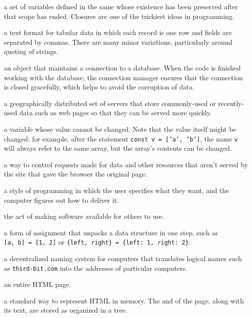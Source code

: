 \begin{description}
a set of variables defined in the same  whose existence has
been preserved after that scope has ended. Closures are one of the trickiest
ideas in programming.

a text format for tabular data in which each record is one row and fields are
separated by commas. There are many minor variations, particularly around
quoting of strings.

an object that maintains a connection to a database. When the code is
finished working with the database, the connection manager ensures that the
connection is closed gracefully, which helps to avoid the corruption of data.

a geographically distributed set of servers that store commonly-used or
recently-used data such as web pages so that they can be served more quickly.

a variable whose value cannot be changed. Note that the value itself might be
changed: for example, after the statement \texttt{const\ v\ =\ {[}'a',\ 'b'{]}}, the name \texttt{v}
will always refer to the same array, but the array's contents can be changed.

a way to control requests made for data and other resources that aren't served
by the site that gave the browser the original page.

a style of programming in which the user specifies what they want, and the
computer figures out how to deliver it.

the act of making software available for others to use.

a form of assignment that unpacks a data structure in one step, such as \texttt{{[}a,\ b{]}\ =\ {[}1,\ 2{]}} or \texttt{\{left,\ right\}\ =\ \{left:\ 1,\ right:\ 2\}}.

a decentralized naming system for computers that translates logical names such
as \texttt{third-bit.com} into the addresses of particular computers.

an entire HTML page.

a standard way to represent HTML in memory. The  and
 of the page, along with its text, are stored as
 organized in a tree.


\end{description}
